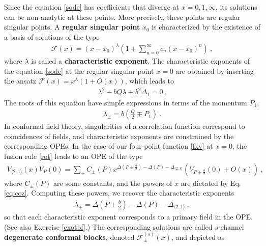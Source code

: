 \documentclass[12pt, a4paper, notitlepage, twoside]{report}
\numberwithin{equation}{section}
\theoremstyle{break}
\begin{document}
Since the equation \eqref{sode} has coefficients that diverge at $x=0,1,\infty$, its solutions can be non-analytic at these points. 
More precisely, these points are regular singular points.
A \textbf{regular singular point} $x_0$ is characterized by the existence of a basis of solutions of the type  
\begin{align}
 \mathcal{F}(x)=(x-x_0)^\lambda\left(1+\sum_{n=0}^\infty c_n (x-x_0)^n\right)\ ,
\label{zxl}
\end{align}
where $\lambda$ is called a \textbf{\boldmath characteristic exponent}.
The characteristic exponents of the equation \eqref{sode} at the regular singular point $x=0$ are obtained by inserting the ansatz $\mathcal{F}(x) = x^\lambda(1+O(x))$, which leads to 
\begin{align}
 \lambda^2 - bQ\lambda + b^2 \Delta_1 = 0 \ .
\end{align}
The roots of this equation have simple expressions in terms of the momentum $P_1$,
\begin{align}
 \lambda_\pm = b\left(\frac{Q}{2}\mp P_1\right) \ .
\label{lpm}
\end{align}
In conformal field theory, singularities of a correlation function correspond to coincidences of fields, and characteristic exponents are constrained by the corresponding OPEs.
In the case of our four-point function \eqref{fxv} at $x=0$, the fusion rule \eqref{rot} leads to an OPE of the type
\begin{align}
 V_{\langle 2,1 \rangle}(x)V_{P}(0) = \sum_\pm C_\pm(P) x^{\Delta\left(P\pm \frac{b}{2}\right) -\Delta(P) - \Delta_{\langle 2,1 \rangle}} \left(V_{P\pm\frac{b}{2}}(0) + O(x)\right)\ ,
\end{align}
where $C_\pm(P)$ are some constants, and the powers of $x$ are dictated by Eq. \eqref{eq:coz}. 
Computing these powers, we recover the characteristic exponents
\begin{align}
 \lambda_\pm = \Delta\left(P\pm \frac{b}{2}\right) -\Delta(P) - \Delta_{\langle 2,1 \rangle} \ ,
\end{align}
so that each characteristic exponent corresponds to a primary field in the OPE.
(See also Exercise \ref{exotbf}.) The corresponding solutions are called $s$-channel \textbf{degenerate conformal blocks}, denoted $\mathcal{F}^{(s)}_\pm(x)$, and depicted as
\end{document}
